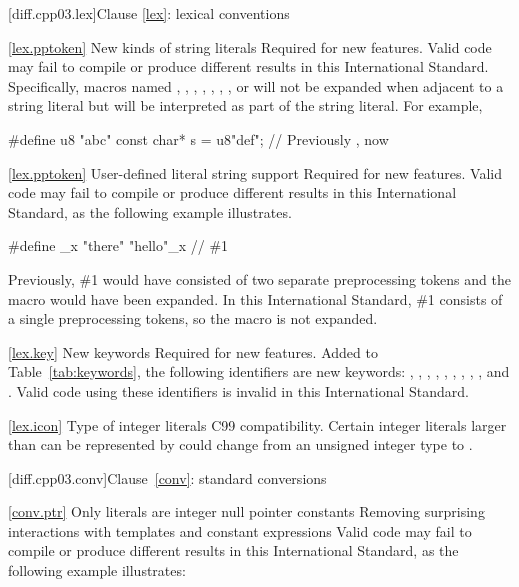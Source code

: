 [diff.cpp03.lex]{Clause \ref{lex}: lexical conventions}

\ref{lex.pptoken}
\change New kinds of string literals
\rationale Required for new features.
\effect
Valid \CppIII code may fail to compile or produce different results in
this International Standard. Specifically, macros named , ,
, , , , , or  will
not be expanded when adjacent to a string literal but will be interpreted as
part of the string literal. For example,

\begin{codeblock}
#define u8 "abc"
const char* s = u8"def";        // Previously , now 
\end{codeblock}

\ref{lex.pptoken}
\change User-defined literal string support
\rationale Required for new features.
\effect
Valid \CppIII code may fail to compile or produce different results in
this International Standard, as the following example illustrates.

\begin{codeblock}
#define _x "there"
"hello"_x         // \#1
\end{codeblock}

Previously, \#1 would have consisted of two separate preprocessing tokens and
the macro  would have been expanded. In this International Standard,
\#1 consists of a single preprocessing tokens, so the macro is not expanded.

\ref{lex.key}
\change New keywords
\rationale Required for new features.
\effect
Added to Table~\ref{tab:keywords}, the following identifiers are new keywords:
,
,
,
,
,
,
,
,
,
and
.
Valid \CppIII code using these identifiers is invalid in this International
Standard.

\ref{lex.icon}
\change Type of integer literals
\rationale C99 compatibility.
\effect
Certain integer literals larger than can be represented by  could
change from an unsigned integer type to .

[diff.cpp03.conv]{Clause~\ref{conv}: standard conversions}

\ref{conv.ptr}
\change Only literals are integer null pointer constants
\rationale Removing surprising interactions with templates and constant
expressions
\effect Valid \CppIII code may fail to compile or produce different results in
this International Standard, as the following example illustrates:

